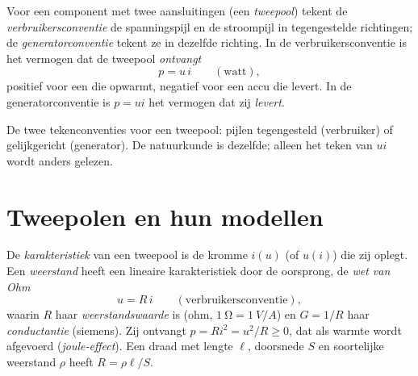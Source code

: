 \begin{notation}\label{not:b1:dc-circuits:conventions}
Voor een component met twee aansluitingen (een \emph{tweepool}) tekent de
\emph{verbruikersconventie} de spanningspijl en de stroompijl in
tegengestelde richtingen; de \emph{generatorconventie} tekent ze in dezelfde
richting. In de verbruikersconventie is het vermogen dat de tweepool
\emph{ontvangt}
\[
p = u\,i \qquad (\text{watt}),
\]
positief voor een  die opwarmt, negatief voor een accu die
levert. In de generatorconventie is $p = ui$ het vermogen dat zij
\emph{levert}.
\end{notation}

\begin{omfigure}

{\small De twee tekenconventies voor een tweepool: pijlen tegengesteld
(verbruiker) of gelijkgericht (generator). De natuurkunde is dezelfde; alleen
het teken van $ui$ wordt anders gelezen.}
\end{omfigure}

\section{Tweepolen en hun modellen}

\begin{definition}\label{def:b1:dc-circuits:resistor}
De \emph{karakteristiek} van een tweepool is de kromme $i(u)$ (of $u(i)$)
die zij oplegt. Een \emph{weerstand} heeft een lineaire karakteristiek door de
oorsprong, de \emph{wet van Ohm}
\[
u = R\,i \qquad (\text{verbruikersconventie}),
\]
waarin $R$ haar \emph{weerstandswaarde} is (ohm, $\qty{1}{\ohm} = \qty{1}{V/A}$) en
$G = 1/R$ haar \emph{conductantie} (siemens). Zij ontvangt $p = Ri^2 =
u^2/R \geq 0$, dat als warmte wordt afgevoerd (\emph{joule-effect}). Een draad met
lengte $\ell$, doorsnede $S$ en soortelijke weerstand $\rho$ heeft
$R = \rho\ell/S$.
\end{definition}

